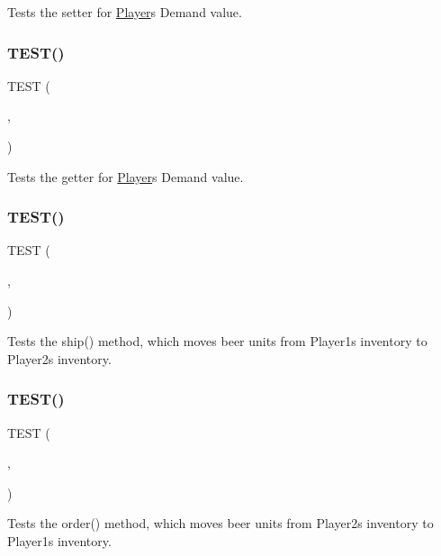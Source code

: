 Tests the setter for \hyperlink{classPlayer}{Player}\textquotesingle{}s Demand value. \mbox{\label{group__group1_ga70081cc20b7aaeb27a4f8c1eb3ff65a5}} 
\subsubsection{\texorpdfstring{T\+E\+S\+T()}{TEST()}\hspace{0.1cm}{\footnotesize\ttfamily [16/18]}}
{\footnotesize\ttfamily T\+E\+ST (\begin{DoxyParamCaption}\item[{player\+Test}]{,  }\item[{get\+Demand\+Test}]{ }\end{DoxyParamCaption})}

Tests the getter for \hyperlink{classPlayer}{Player}\textquotesingle{}s Demand value. \mbox{\label{group__group1_ga2eceb45b45bcbec68c76df2065d99ad3}} 
\subsubsection{\texorpdfstring{T\+E\+S\+T()}{TEST()}\hspace{0.1cm}{\footnotesize\ttfamily [17/18]}}
{\footnotesize\ttfamily T\+E\+ST (\begin{DoxyParamCaption}\item[{player\+Test}]{,  }\item[{ship\+Test}]{ }\end{DoxyParamCaption})}

Tests the ship() method, which moves beer units from Player1\textquotesingle{}s inventory to Player2\textquotesingle{}s inventory. \mbox{\label{group__group1_ga2bc551dcf717827b20b4024e4f272857}} 
\subsubsection{\texorpdfstring{T\+E\+S\+T()}{TEST()}\hspace{0.1cm}{\footnotesize\ttfamily [18/18]}}
{\footnotesize\ttfamily T\+E\+ST (\begin{DoxyParamCaption}\item[{player\+Test}]{,  }\item[{order\+Test}]{ }\end{DoxyParamCaption})}

Tests the order() method, which moves beer units from Player2\textquotesingle{}s inventory to Player1\textquotesingle{}s inventory. 